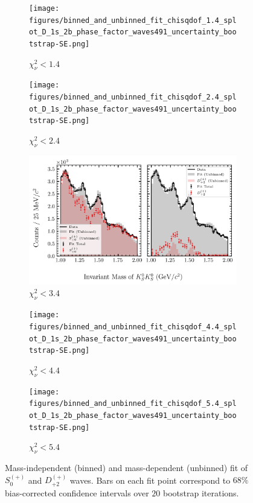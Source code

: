 \begin{figure}[htbp]
    \centering
    \begin{subfigure}{0.45\textwidth}
        \texttt{[image: figures/binned\_and\_unbinned\_fit\_chisqdof\_1.4\_splot\_D\_1s\_2b\_phase\_factor\_waves491\_uncertainty\_bootstrap-SE.png]}
        \caption{$\chi^2_\nu < 1.4$}
    \end{subfigure}
    \hfill
    \begin{subfigure}{0.45\textwidth}
        \texttt{[image: figures/binned\_and\_unbinned\_fit\_chisqdof\_2.4\_splot\_D\_1s\_2b\_phase\_factor\_waves491\_uncertainty\_bootstrap-SE.png]}
        \caption{$\chi^2_\nu < 2.4$}
    \end{subfigure}

    \vspace{1em}

    \begin{subfigure}{0.8\textwidth}
        \includegraphics[width=\linewidth]{figures/binned_and_unbinned_fit_chisqdof_3.4_splot_D_1s_2b_phase_factor_waves491_uncertainty_bootstrap-SE.png}
        \caption{$\chi^2_\nu < 3.4$}
    \end{subfigure}

    \vspace{1em}

    \begin{subfigure}{0.45\textwidth}
        \texttt{[image: figures/binned\_and\_unbinned\_fit\_chisqdof\_4.4\_splot\_D\_1s\_2b\_phase\_factor\_waves491\_uncertainty\_bootstrap-SE.png]}
        \caption{$\chi^2_\nu < 4.4$}
    \end{subfigure}
    \hfill
    \begin{subfigure}{0.45\textwidth}
        \texttt{[image: figures/binned\_and\_unbinned\_fit\_chisqdof\_5.4\_splot\_D\_1s\_2b\_phase\_factor\_waves491\_uncertainty\_bootstrap-SE.png]}
        \caption{$\chi^2_\nu < 5.4$}
    \end{subfigure}

    \caption{Mass-independent (binned) and mass-dependent (unbinned) fit of $S_{0}^{(+)}$ and $D_{+2}^{(+)}$ waves. Bars on each fit point correspond to $68\%$ bias-corrected confidence intervals over $20$ bootstrap iterations.}
    \label{fig:unbinned-fit-all-Sp-D2p}
\end{figure}

